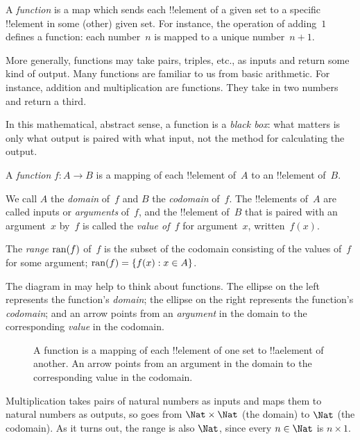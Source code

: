 \documentclass[../../../include/open-logic-section]{subfiles}
\begin{document}

\begin{explain}
A \emph{function} is a map which sends each !!{element} of a given set
to a specific !!{element} in some (other) given set. For instance, the
operation of adding~$1$ defines a function: each number~$n$ is mapped
to a unique number~$n+1$. 
  
More generally, functions may take pairs, triples, etc., as inputs and
return some kind of output. Many functions are familiar to us from
basic arithmetic. For instance, addition and multiplication are
functions. They take in two numbers and return a third.

In this mathematical, abstract sense, a function is a \emph{black
box}: what matters is only what output is paired with what input, not
the method for calculating the output.
\end{explain}

\begin{defn}[Function]
A \emph{function} $f \colon A \to B$ is a mapping of each !!{element}
of~$A$ to an !!{element} of~$B$.

We call $A$ the \emph{domain} of~$f$ and $B$ the \emph{codomain}
of~$f$.  The !!{element}s of~$A$ are called inputs or \emph{arguments}
of~$f$, and the !!{element} of~$B$ that is paired with an argument~$x$
by~$f$ is called the \emph{value of~$f$} for argument~$x$,
written~$f(x)$.

The \emph{range} $\mathrm{ran}(f)$ of~$f$ is the subset of the codomain
consisting of the values of~$f$ for some argument; $\mathrm{ran}(f) =
\{ f(x) : x \in A \}$.
\end{defn}

The diagram in  may help to think about functions. The ellipse
on the left represents the function's \emph{domain}; the ellipse on
the right represents the function's \emph{codomain}; and an arrow
points from an \emph{argument} in the domain to the corresponding
\emph{value} in the codomain.

\begin{figure}
  \caption{A function is a mapping of each !!{element} of one set to
    !!a{element} of another. An arrow points from an argument in the
    domain to the corresponding value in the codomain.}
\end{figure}

\begin{ex}
Multiplication takes pairs of natural numbers as inputs and maps them
to natural numbers as outputs, so goes from $\Nat \times \Nat$ (the
domain) to $\Nat$ (the codomain). As it turns out, the range is also
$\Nat$, since every $n \in \Nat$ is $n \times 1$.
\end{ex}
\end{document}
